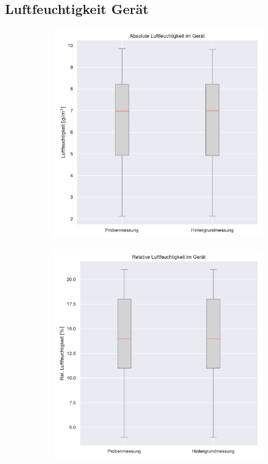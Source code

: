 \documentclass[11pt, a4paper]{article}
\begin{document}
\subsection{Luftfeuchtigkeit Gerät}

\begin{figure}[h!]
    \centering
    \begin{subfigure}[c]{0.49\textwidth}
        \centering
        \includegraphics[width=\textwidth]{Figures/abshum_plot}
        \caption{}
    \end{subfigure}
    \begin{subfigure}[c]{0.49\textwidth}
        \centering
        \includegraphics[width=\textwidth]{Figures/rehum_plot}

\end{subfigure}
\end{figure}
\end{document}
